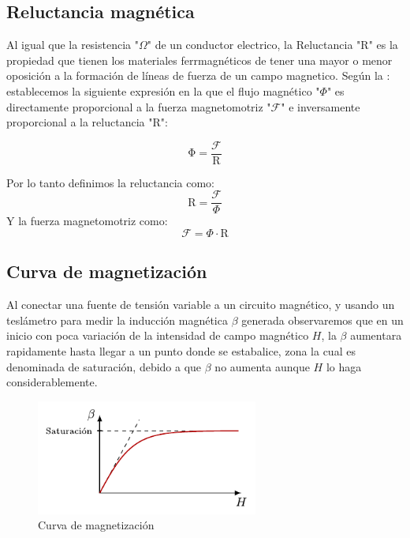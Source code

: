 \documentclass{report}
\begin{document}
  \subsection{Reluctancia magnética}\label{ssec:reluctancia}
Al igual que la resistencia "$\Omega$" de un conductor electrico, la Reluctancia "$\mathrm{R}$" es la propiedad que tienen los materiales
ferrmagnéticos de tener una mayor o menor oposición a la formación de líneas de fuerza de un campo magnetico.
\newline\vspace{1em}
Según la : establecemos la siguiente expresión en la que el flujo magnético "$\Phi$" es directamente proporcional
a la fuerza magnetomotriz "$\mathcal{F}$" e inversamente proporcional a la reluctancia "$\mathrm{R}$":
\begin{figure}[h]
  \[
    \mathrm{\Phi} = \frac{\mathcal{F}}{\mathrm{R}}
  \]
\label{equ:reluctancia}
\end{figure}
\newline Por lo tanto definimos la reluctancia como:
\[
\mathrm{R} = \frac{\mathcal{F}}{\Phi}
\]
\newline Y la fuerza magnetomotriz como:
\[
\mathcal{F} = \Phi \cdot \mathrm{R}
\]

  \subsection{Curva de magnetización}\label{ssec:curva_magnetizada}
Al conectar una fuente de tensión variable a un circuito magnético, y usando un teslámetro para medir la inducción magnética $\beta$ generada
observaremos que en un inicio con poca variación de la intensidad de campo magnético $H$, la $\beta$ aumentara rapidamente
hasta llegar a un punto donde se estabalice, zona la cual es denominada de saturación, debido a que $\beta$ no aumenta aunque $H$ lo haga considerablemente.
\begin{figure}[h]
  \centering
  \includegraphics[width=0.65\textwidth]{figures/curva_magnetizacion.pdf}
  \caption{Curva de magnetización}
  \label{fig:curva_magnetizacion}
\end{figure}
\end{document}
